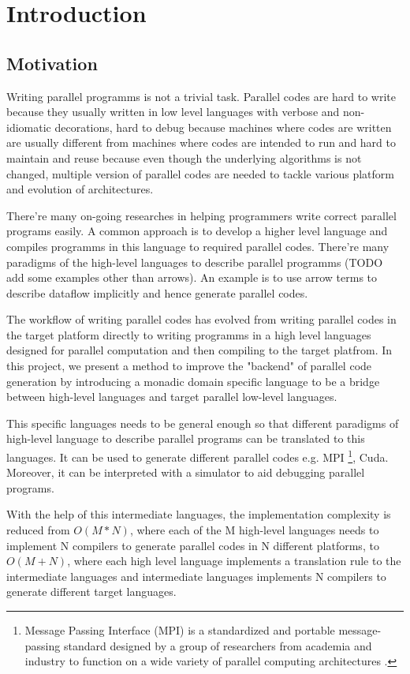 \chapter{Introduction}
\section{Motivation}
Writing parallel programms is not a trivial task. Parallel codes are hard to write because they usually written in low level languages with verbose and non-idiomatic decorations, hard to debug because machines where codes are written are usually different from machines where codes are intended to run and hard to maintain and reuse because even though the underlying algorithms is not changed, multiple version of parallel codes are needed to tackle various platform and evolution of architectures.

There're many on-going researches in helping programmers write correct parallel programs easily. A common approach is to develop a higher level language and compiles programms in this language to required parallel codes. There're many paradigms of the high-level languages to describe parallel programms (TODO add some examples other than arrows). An example is to use arrow terms \cite{braunArrowsParallelComputation2018} to describe dataflow implicitly and hence generate parallel codes.

The workflow of writing parallel codes has evolved from writing parallel codes in the target platform directly to writing programms in a high level languages designed for parallel computation and then compiling to the target platfrom. In this project, we present a method to improve the "backend" of parallel code generation by introducing a monadic domain specific language to be a bridge between high-level languages and target parallel low-level languages.

This specific languages needs to be general enough so that different paradigms of high-level language to describe parallel programs can be translated to this languages. It can be used to generate different parallel codes e.g. MPI \footnote{Message Passing Interface (MPI) is a standardized and portable message-passing standard designed by a group of researchers from academia and industry to function on a wide variety of parallel computing architectures \cite{MessagePassingInterface2018}.}, Cuda. Moreover, it can be interpreted with a simulator to aid debugging parallel programs.

With the help of this intermediate languages, the implementation complexity is reduced from $O(M * N)$, where each of the M high-level languages needs to implement N compilers to generate parallel codes in N different platforms, to $O(M + N)$, where each high level language implements a translation rule to the intermediate languages and intermediate languages implements N compilers to generate different target languages.

